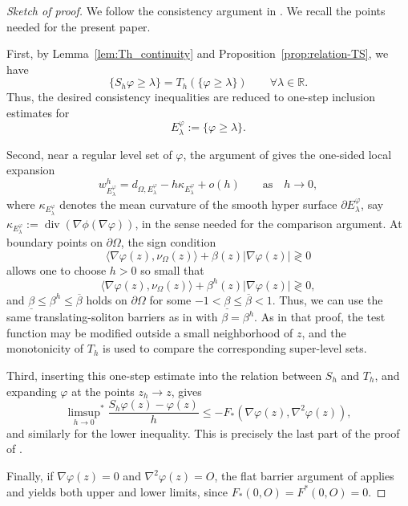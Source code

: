 \documentclass[11pt]{article}
\numberwithin{equation}{section}
\newcommand{\R}{\mathbb{R}}
\newcommand{\pOmega}[0]{\partial\Omega}
\newcommand{\relaxlimitSup}[0]{{\limsup_{h\to 0}}^*}
\def\le{\leqslant}
\def\leq{\leqslant}
\def\ge{\geqslant}
\begin{document}
\begin{proof}[Sketch of proof]
We follow the consistency argument in \cite[Theorem 4.3]{EG25}.
We recall the points needed for the present paper.

First, by Lemma~\ref{lem:Th_continuity} and
Proposition~\ref{prop:relation-TS}, we have
\[
    \{S_h\varphi\ge\lambda\}
    =
    T_h(\{\varphi\ge\lambda\})\qquad\forall\lambda\in\R.
\]
Thus, the desired consistency inequalities are reduced to one-step
inclusion estimates for
\[
    E^\varphi_\lambda:=\{\varphi\ge\lambda\}.
\]

Second, near a regular level set of \(\varphi\), the argument of
\cite[Proposition 4.2]{EG25} gives the one-sided local expansion
\[
    w^h_{E^\varphi_\lambda}
    =
    d_{\Omega,E^\varphi_\lambda}
    -
    h\kappa_{E^\varphi_\lambda}
    +
    o(h)\qquad\mbox{as}\quad h\to 0,
\]
where $\kappa_{E^\varphi_\lambda}$ denotes the mean curvature of the smooth hyper surface $\partial E^\varphi_\lambda$, say $\kappa_{E^\varphi_\lambda} := \operatorname{div}(\nabla\phi(\nabla\varphi))$,
in the sense needed for the comparison argument. At boundary points on $\pOmega$,
the sign condition
\[
    \langle\nabla\varphi(z),\nu_\Omega(z)\rangle
    +\beta(z)|\nabla\varphi(z)|\gtrless 0
\]
allows one to choose $h>0$ so small that
\[
    \langle\nabla\varphi(z),\nu_\Omega(z)\rangle
    +\beta^h(z)|\nabla\varphi(z)|\gtrless 0,
\]
and $\underline{\beta}\leq \beta^h\leq \overline{\beta}$ holds on $\pOmega$ for some $-1 < \underline{\beta}\leq \overline{\beta}<1$.
Thus, we can use the same translating-soliton barriers as in
\cite{EG25} with $\beta = \beta^h$. As in that proof, the test function may be modified outside
a small neighborhood of \(z\), and the monotonicity of \(T_h\) is used to
compare the corresponding super-level sets.

Third, inserting this one-step estimate into the relation between
\(S_h\) and \(T_h\), and expanding \(\varphi\) at the points
\(z_h\to z\), gives
\[
    \relaxlimitSup
    \frac{S_h\varphi(z)-\varphi(z)}{h}
    \le
    -F_*(\nabla\varphi(z),\nabla^2\varphi(z)),
\]
and similarly for the lower inequality. This is precisely the last part
of the proof of \cite[Theorem 4.3]{EG25}.

Finally, if \(\nabla\varphi(z)=0\) and \(\nabla^2\varphi(z)=O\), the flat
barrier argument of \cite[Theorem 4.3]{EG25} applies and yields both
upper and lower limits, since \(F_*(0,O)=F^*(0,O)=0\).
\end{proof}
\end{document}
